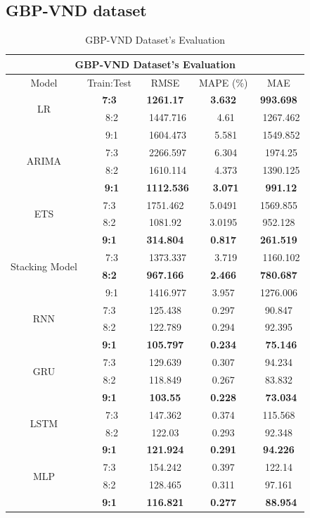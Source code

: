 \documentclass{ieeeojies}
\begin{document}
\subsection{GBP-VND dataset} 
\begin{table}[H]
    \centering
    \begin{tabular}{|c|c|c|c|c|}
         \hline
         \multicolumn{5}{|c|}{\textbf{GBP-VND Dataset's Evaluation}}\\
         \hline
         \centering Model & Train:Test & RMSE & MAPE (\%) & MAE\\
         \hline
         \multirow{2}{*}{LR} &\textbf{7:3} &\textbf{1261.17} &\textbf{3.632} &\textbf{993.698} \\ &\ 8:2 &\ 1447.716	&\ 4.61 &\ 1267.462 \\&\ 9:1 &\ 1604.473 &\ 5.581 &\ 1549.852 \\
         \hline
         \multirow{2}{*}{ARIMA} &\ 7:3 &\ 2266.597 &\ 6.304 &\ 1974.25 \\ &\ 8:2 &\ 1610.114 &\ 4.373 &\ 1390.125 \\&\ \textbf{9:1} &\ \textbf{1112.536} &\ \textbf{3.071} &\ \textbf{991.12} \\
         \hline
         \multirow{2}{*}{ETS} & 7:3 & 1751.462&5.0491&1569.855 \\ & 8:2 & 1081.92&3.0195&952.128 \\& \textbf{9:1} & \textbf{314.804} & \textbf{0.817} & \textbf{261.519} \\
         \hline
         \multirow{2}{*}{Stacking Model} &\ 7:3 &\ 1373.337 &\ 	3.719 &\ 	1160.102\\ & \textbf{8:2} &\textbf{967.166	} &\textbf{	2.466} &\textbf{780.687}\\&\ 9:1 &\ 1416.977	&3.957	&1276.006 \\
         \hline
         \multirow{2}{*}{RNN} & 7:3 & 125.438 & 0.297 & 90.847 \\ & 8:2 & 122.789 & 0.294 & 92.395 \\ & \textbf{9:1} & \textbf{105.797} & \textbf{0.234} &\ \textbf{75.146} \\
         \hline
         \multirow{2}{*}{GRU} & 7:3 & 129.639 & 0.307 & 94.234 \\ & 8:2 & 118.849 & 0.267 & 83.832 \\ & \textbf{9:1} & \textbf{103.55} & \textbf{0.228} &\ \textbf{73.034} \\
         \hline
         \multirow{2}{*}{LSTM} &\ 7:3 &147.362&	0.374	&115.568 \\ &\ 8:2 &122.03&	0.293&	92.348 \\&\textbf{9:1}&\textbf{121.924		} &\textbf{0.291} &\textbf{94.226} \\
         \hline
         \multirow{2}{*}{MLP} & 7:3 & 154.242 & 0.397 & 122.14 \\ & 8:2 & 128.465 & 0.311 & 97.161 \\ & \textbf{9:1} & \textbf{116.821} & \textbf{0.277} &\ \textbf{88.954} \\
         \hline
    \end{tabular}
    \caption{GBP-VND Dataset's Evaluation}
    \label{mbbresult}
\end{table}
\end{document}
